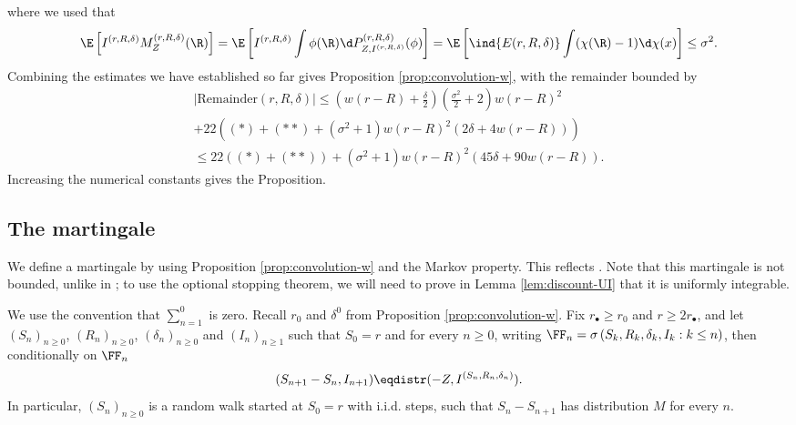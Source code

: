 \documentclass[10pt,a4paper]{article}
\begin{document}
where we used that 
\[ \E\left[ I^{(r,R,\delta)} M^{(r,R,\delta)}_Z(\R) \right] = \E\left[ I^{(r,R,\delta)} \int \phi(\R) \d P^{(r,R,\delta)}_{Z,  I^{(r,R,\delta)}}(\phi) \right] = \E\left[ \ind{E(r,R,\delta)} \int (\chi(\R)-1) \d\chi(x) \right] \leq \sigma^2 . \]
Combining the estimates we have established so far gives Proposition \ref{prop:convolution-w}, with the remainder bounded by
\begin{multline*}
|\mathrm{Remainder}(r,R,\delta)| \leq \left(w(r-R)+\frac{\delta}{2}\right)\left(\frac{\sigma^2}{2}+2\right) w(r-R)^2 \\
+ 22 \left((*) + (**) + (\sigma^2 + 1) w(r-R)^2 \left( 2\delta + 4w(r-R) \right) \right) \\
\leq 22 \left((*) + (**) \right) + (\sigma^2 + 1) w(r-R)^2 \left( 45\delta + 90 w(r-R) \right) .
\end{multline*}
Increasing the numerical constants gives the Proposition. 



\subsection{The martingale}
\label{sec:the-martingale}


We define a martingale by using Proposition \ref{prop:convolution-w} and the Markov property. This reflects \cite[Proposition 6]{lalley2015maximal}. Note that this martingale is not bounded, unlike in \cite{lalley2015maximal}; to use the optional stopping theorem, we will need to prove in Lemma \ref{lem:discount-UI} that it is uniformly integrable.

We use the convention that $\sum_{n=1}^0$ is zero. Recall $r_0$ and $\delta^0$ from Proposition \ref{prop:convolution-w}. Fix $r_\bullet \geq r_0$ and $r \geq 2 r_\bullet$, and let $(S_n)_{n\geq 0}$, $(R_n)_{n\geq 0}$, $(\delta_n)_{n\geq 0}$ and $(I_n)_{n\geq 1}$ such that $S_0 = r$ and for every $n\geq 0$, writing $\FF_n = \sigma\left( S_k, R_k, \delta_k, I_k : k\leq n\right)$, then conditionally on $\FF_n$
\begin{equation}
(S_{n+1} - S_n , I_{n+1}) \eqdistr (- Z, I^{(S_n,R_n, \delta_n)}) .
\end{equation}
In particular, $(S_n)_{n\geq 0}$ is a random walk started at $S_0 = r$ with i.i.d. steps, such that $S_n-S_{n+1}$ has distribution $M$ for every $n$. 
\end{document}

